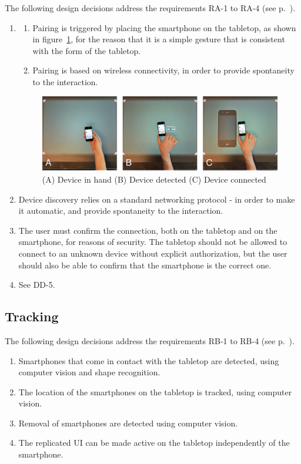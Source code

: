 The following design decisions address the requirements RA-1 to RA-4 (see p.~\pageref{RA}).

\begin{enumerate}[{DA}-1]
\item \hfill
	\begin{enumerate}[{DA-1}a]
	\item Pairing is triggered by placing the smartphone on the tabletop, as shown in figure~\ref{fig:sqPair}, for the reason that it is a simple gesture that is consistent with the form of the tabletop.
	\item Pairing is based on wireless connectivity, in order to provide spontaneity to the interaction.
	\end{enumerate}
	
\begin{figure}[htb]
  \centering
    \includegraphics[width=0.7\linewidth]{images/sqPair}
  \caption{(A) Device in hand (B) Device detected (C) Device connected}
  \label{fig:sqPair}
\end{figure}

\item Device discovery relies on a standard networking protocol - in order to make it automatic, and provide spontaneity to the interaction.
\item The user must confirm the connection, both on the tabletop and on the smartphone, for reasons of security.
The tabletop should not be allowed to connect to an unknown device without explicit authorization, but the user should also be able to confirm that the smartphone is the correct one.
\item See DD-5.
\end{enumerate}

\subsection{Tracking}

The following design decisions address the requirements RB-1 to RB-4 (see p.~\pageref{RB}).

\label{DB}
\begin{enumerate}[{DB}-1]
\item Smartphones that come in contact with the tabletop are detected, using computer vision and shape recognition.
\item The location of the smartphones on the tabletop is tracked, using computer vision.
\item Removal of smartphones are detected using computer vision.
\item The replicated UI can be made active on the tabletop independently of the smartphone.
\end{enumerate}

